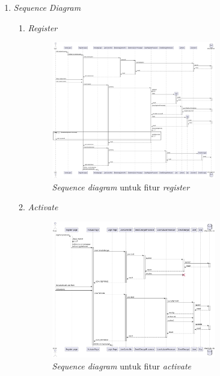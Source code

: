 \documentclass[a4paper]{article}
\begin{document}
\begin{enumerate}
    \item \textit{Sequence Diagram}
    \begin{enumerate}
        \item \textit{Register}\\
        \begin{figure}[h]
            \centering
            \includegraphics*[height=6cm]{diagram/sequence diagram/1. register/register.png}
            \caption{\textit{Sequence diagram} untuk fitur \textit{register}}
        \end{figure}
        \item \textit{Activate}\\
        \begin{figure}[h]
            \centering
            \includegraphics*[height=6cm]{diagram/sequence diagram/2. activate/activate.png}
            \caption{\textit{Sequence diagram} untuk fitur \textit{activate}}
        \end{figure}
        \newpage


\end{enumerate}
\end{enumerate}
\end{document}
